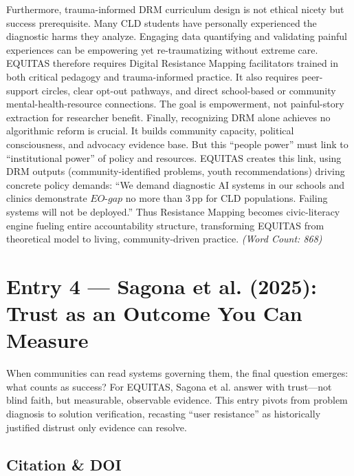 \documentclass[11pt,twoside]{article}
\DeclareRobustCommand{\EOgap}{EO\text{-}gap\xspace}
\DeclareRobustCommand{\pp}{pp\xspace} %
\begin{document}
Furthermore, trauma-informed DRM curriculum design is not ethical nicety but success prerequisite. Many CLD students have personally experienced the diagnostic harms they analyze. Engaging data quantifying and validating painful experiences can be empowering yet re-traumatizing without extreme care. EQUITAS therefore requires Digital Resistance Mapping facilitators trained in both critical pedagogy and trauma-informed practice. It also requires peer-support circles, clear opt-out pathways, and direct school-based or community mental-health-resource connections. The goal is empowerment, not painful-story extraction for researcher benefit. Finally, recognizing DRM alone achieves no algorithmic reform is crucial. It builds community capacity, political consciousness, and advocacy evidence base. But this ``people power'' must link to ``institutional power'' of policy and resources. EQUITAS creates this link, using DRM outputs (community-identified problems, youth recommendations) driving concrete policy demands: ``We demand diagnostic AI systems in our schools and clinics demonstrate $\EOgap$ no more than 3\,\pp for CLD populations. Failing systems will not be deployed.'' Thus Resistance Mapping becomes civic-literacy engine fueling entire accountability structure, transforming EQUITAS from theoretical model to living, community-driven practice. \textit{(Word Count: 868)}

\newpage


\setcounter{page}{14}

\section*{\label{entry4}Entry 4 --- Sagona et al. (2025): Trust as an Outcome You Can Measure}

\vspace{-0.3cm}

When communities can read systems governing them, the final question emerges: what counts as success? For \textsc{EQUITAS}, Sagona et al. answer with trust---not blind faith, but measurable, observable evidence. This entry pivots from problem diagnosis to solution verification, recasting ``user resistance'' as historically justified distrust only evidence can resolve.

\vspace{-0.3cm}

\subsection*{Citation \& DOI}
\end{document}
